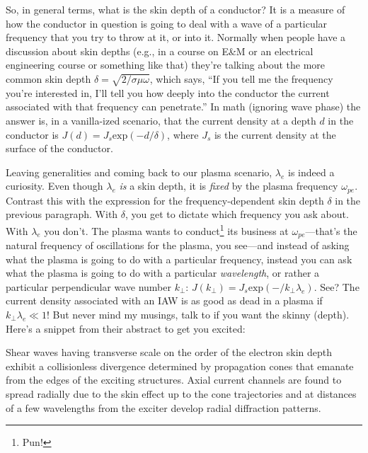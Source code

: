 So, in general terms, what is the skin depth of a conductor? It is a measure of
how the conductor in question is going to deal with a wave of a particular
frequency that you try to throw at it, or into it. Normally when people have a
discussion about skin depths (e.g., in a course on E\&M or an electrical
engineering course or something like that) they're talking about the more common
skin depth $\delta = \sqrt{2 / \sigma \mu \omega}$, which says, ``If you tell me
the frequency you're interested in, I'll tell you how deeply into the conductor
the current associated with that frequency can penetrate.'' In math (ignoring
wave phase) the answer is, in a vanilla-ized scenario, that the current density
at a depth $d$ in the conductor is $J (d) = J_s \mathrm{exp} ( - d / \delta )$,
where $J_s$ is the current density at the surface of the conductor.

Leaving generalities and coming back to our plasma scenario, $\lambda_e$ is
indeed a curiosity. Even though $\lambda_e$ \emph{is} a skin depth, it is
\emph{fixed} by the plasma frequency $\omega_{pe}$. Contrast this with the
expression for the frequency-dependent skin depth $\delta$ in the previous
paragraph. With $\delta$, you get to dictate which frequency you ask about. With
$\lambda_e$ you don't. The plasma wants to conduct\footnote{Pun!} its business
at $\omega_{pe}$---that's the natural frequency of oscillations for the plasma,
you see---and instead of asking what the plasma is going to do with a particular
frequency, instead you can ask what the plasma is going to do with a particular
\emph{wavelength}, or rather a particular perpendicular wave number $k_\perp$:
$J ( k_\perp ) = J_s \mathrm{exp} ( - / k_\perp \lambda_e )$. See? The current
density associated with an IAW is as good as dead in a plasma if $k_\perp
\lambda_e \ll 1$! But never mind my musings, talk to \citet{Morales1994} if you
want the skinny (depth). Here's a snippet from their abstract to get you
excited:

\begin{displayquote}
  Shear \Alf waves having transverse scale on the order of the electron skin
  depth exhibit a collisionless divergence determined by propagation cones that
  emanate from the edges of the exciting structures. Axial current channels are
  found to spread radially due to the skin effect up to the cone trajectories
  and at distances of a few wavelengths from the exciter develop radial
  diffraction patterns.
\end{displayquote}

